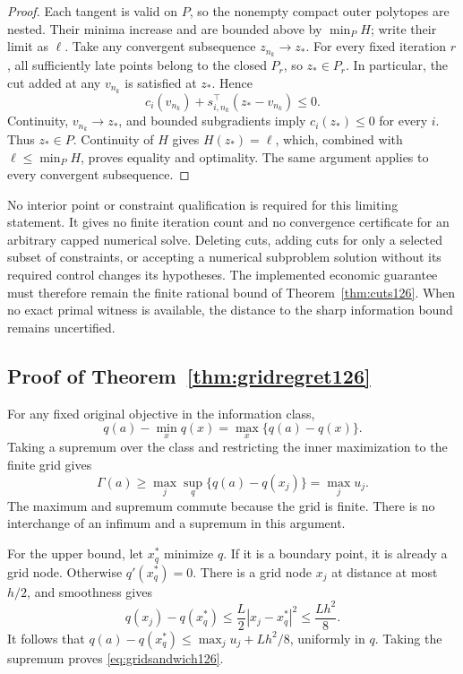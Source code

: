 \begin{proof}
Each tangent is valid on $P$, so the nonempty compact outer
polytopes are nested. Their minima increase and are bounded above
by $\min_PH$; write their limit as $\ell$. Take any convergent
subsequence $z_{n_k}\to z_*$. For every fixed iteration $r$,
all sufficiently late points belong to the closed $P_r$, so
$z_*\in P_r$. In particular, the cut added at any $v_{n_k}$
is satisfied at $z_*$. Hence
\[
 c_i(v_{n_k})+s_{i,n_k}^\top(z_*-v_{n_k})\le0.
\]
Continuity, $v_{n_k}\to z_*$, and bounded subgradients imply
$c_i(z_*)\le0$ for every $i$. Thus $z_*\in P$.
Continuity of $H$ gives $H(z_*)=\ell$, which, combined with
$\ell\le\min_PH$, proves equality and optimality. The same
argument applies to every convergent subsequence.
\end{proof}

No interior point or constraint qualification is required for this
limiting statement. It gives no finite iteration count and no
convergence certificate for an arbitrary capped numerical solve.
Deleting cuts, adding cuts for only a selected subset of constraints,
or accepting a numerical subproblem solution without its required
control changes its hypotheses. The implemented economic guarantee
must therefore remain the finite rational bound of
Theorem~\ref{thm:cuts126}. When no exact primal witness is available,
the distance to the sharp information bound remains uncertified.

\subsection{Proof of Theorem~\ref{thm:gridregret126}}

For any fixed original objective in the information class,
\[
 q(a)-\min_xq(x)=\max_x\{q(a)-q(x)\}.
\]
Taking a supremum over the class and restricting the inner maximization
to the finite grid gives
\[
 \Gamma(a)\ge\max_j\sup_q\{q(a)-q(x_j)\}
                  =\max_j u_j.
\]
The maximum and supremum commute because the grid is finite. There
is no interchange of an infimum and a supremum in this argument.

For the upper bound, let $x_q^*$ minimize $q$. If it is a boundary
point, it is already a grid node. Otherwise $q'(x_q^*)=0$.
There is a grid node $x_j$ at distance at most $h/2$, and smoothness
gives
\[
 q(x_j)-q(x_q^*)\le\frac L2|x_j-x_q^*|^2
                                      \le\frac{Lh^2}{8}.
\]
It follows that
$q(a)-q(x_q^*)\le\max_j u_j+Lh^2/8$, uniformly in $q$.
Taking the supremum proves \eqref{eq:gridsandwich126}.

